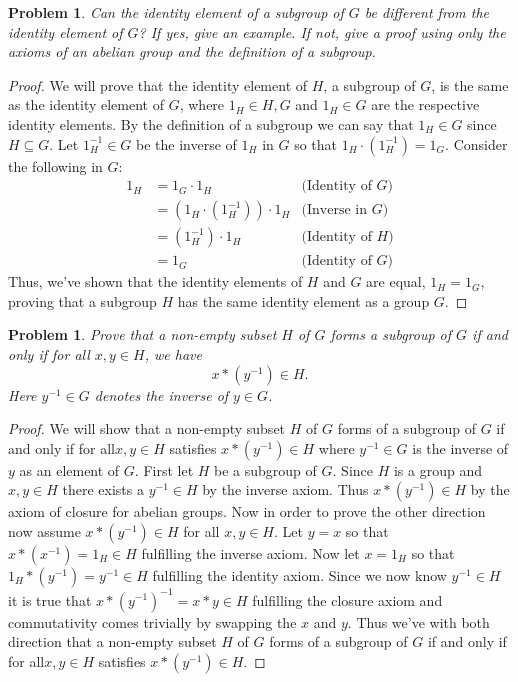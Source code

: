 \documentclass[12pt, letterpaper]{article}
\theoremstyle{plain}
\newtheorem{prob}[theorem]{Problem}
\theoremstyle{definition}
\theoremstyle{remark}
\begin{document}
\begin{prob}
Can the identity element of a subgroup of $G$ be different from the identity element of $G$? If yes, give an example. If not, give a proof using only the axioms of an abelian group and the definition of a subgroup.
\end{prob}

\begin{proof}
    We will prove that the identity element of $H$, a subgroup of $G$, is the same as the identity element of $G$, where $1_H\in H,G$ and $1_H\in G$ are the respective identity elements. By the definition of a subgroup we can say that $1_H\in G$ since $H\subseteq G$. Let $1_H^{-1}\in G$ be the inverse of $1_H$ in $G$ so that $1_H\cdot (1_H^{-1})=1_G$. Consider the following in $G$:
    \begin{align*}
        1_H &= 1_G\cdot 1_H                  &\text{(Identity of $G$)} \\
            &= (1_H\cdot(1_H^{-1}))\cdot 1_H &\text{(Inverse in $G$)} \\
            &= (1_H^{-1})\cdot 1_H           &\text{(Identity of $H$)} \\
            &= 1_G                           &\text{(Identity of $G$)}
    \end{align*}
    Thus, we've shown that the identity elements of $H$ and $G$ are equal, $1_H=1_G$, proving that a subgroup $H$ has the same identity element as a group $G$.
\end{proof}

\begin{prob}
Prove that a non-empty subset $H$ of $G$ forms a subgroup of $G$ if and only if for all $x,y\in H$, we have $$x*(y^{-1})\in H.$$ Here $y^{-1}\in G$ denotes the inverse of $y\in G$.
\end{prob}

\begin{proof}
    We will show that a non-empty subset $H$ of $G$ forms of a subgroup of $G$ if and only if for all$x,y\in H$ satisfies $x*(y^{-1})\in H$ where $y^{-1}\in G$ is the inverse of $y$ as an element of $G$. First let $H$ be a subgroup of $G$. Since $H$ is a group and $x,y\in H$ there exists a $y^{-1}\in H$ by the inverse axiom. Thus $x*(y^{-1})\in H$ by the axiom of closure for abelian groups. Now in order to prove the other direction now assume $x*(y^{-1})\in H$ for all $x,y\in H$. Let $y=x$ so that $x*(x^{-1})=1_H\in H$ fulfilling the inverse axiom. Now let $x=1_H$ so that $1_H*(y^{-1})=y^{-1}\in H$ fulfilling the identity axiom. Since we now know $y^{-1}\in H$ it is true that $x*(y^{-1})^{-1}=x*y\in H$ fulfilling the closure axiom and commutativity comes trivially by swapping the $x$ and $y$. Thus we've with both direction that a non-empty subset $H$ of $G$ forms of a subgroup of $G$ if and only if for all$x,y\in H$ satisfies $x*(y^{-1})\in H$.
\end{proof}
\end{document}
